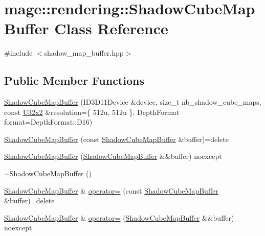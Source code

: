 \hypertarget{classmage_1_1rendering_1_1_shadow_cube_map_buffer}{}\section{mage\+:\+:rendering\+:\+:Shadow\+Cube\+Map\+Buffer Class Reference}
\label{classmage_1_1rendering_1_1_shadow_cube_map_buffer}


{\ttfamily \#include $<$shadow\+\_\+map\+\_\+buffer.\+hpp$>$}

\subsection*{Public Member Functions}
\begin{DoxyCompactItemize}
\item 
\hyperlink{classmage_1_1rendering_1_1_shadow_cube_map_buffer_aeb1c633be265f8c03dd4e525e069de03}{Shadow\+Cube\+Map\+Buffer} (I\+D3\+D11\+Device \&device, size\+\_\+t nb\+\_\+shadow\+\_\+cube\+\_\+maps, const \hyperlink{namespacemage_a88e05bff0300120c013285d3dcad95c5}{U32x2} \&resolution=\{ 512u, 512u \}, Depth\+Format format=\+Depth\+Format\+::\+D16)
\item 
\hyperlink{classmage_1_1rendering_1_1_shadow_cube_map_buffer_a724d0d73588f2e698f2748209befdba8}{Shadow\+Cube\+Map\+Buffer} (const \hyperlink{classmage_1_1rendering_1_1_shadow_cube_map_buffer}{Shadow\+Cube\+Map\+Buffer} \&buffer)=delete
\item 
\hyperlink{classmage_1_1rendering_1_1_shadow_cube_map_buffer_ac636a06f0001b7317ca252b06025ffc4}{Shadow\+Cube\+Map\+Buffer} (\hyperlink{classmage_1_1rendering_1_1_shadow_cube_map_buffer}{Shadow\+Cube\+Map\+Buffer} \&\&buffer) noexcept
\item 
\hyperlink{classmage_1_1rendering_1_1_shadow_cube_map_buffer_a674fdad641a8892821ff8e76d4f05a88}{$\sim$\+Shadow\+Cube\+Map\+Buffer} ()
\item 
\hyperlink{classmage_1_1rendering_1_1_shadow_cube_map_buffer}{Shadow\+Cube\+Map\+Buffer} \& \hyperlink{classmage_1_1rendering_1_1_shadow_cube_map_buffer_a25b59803df1595c97b452dd91c661854}{operator=} (const \hyperlink{classmage_1_1rendering_1_1_shadow_cube_map_buffer}{Shadow\+Cube\+Map\+Buffer} \&buffer)=delete
\item 
\hyperlink{classmage_1_1rendering_1_1_shadow_cube_map_buffer}{Shadow\+Cube\+Map\+Buffer} \& \hyperlink{classmage_1_1rendering_1_1_shadow_cube_map_buffer_a5eb775fdc0f94c220b0115f2695ef18b}{operator=} (\hyperlink{classmage_1_1rendering_1_1_shadow_cube_map_buffer}{Shadow\+Cube\+Map\+Buffer} \&\&buffer) noexcept

\end{DoxyCompactItemize}
